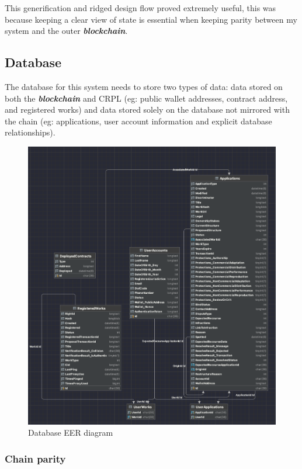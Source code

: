 \documentclass[12pt]{article}
\newcommand{\keyword}[1]{\textbf{\textit{#1}}}
\begin{document}
This generification and ridged design flow proved extremely useful, this was because keeping a clear view of state is essential when keeping parity between my system and the outer \keyword{blockchain}.

\subsection{Database}

The database for this system needs to store two types of data: data stored on both the \keyword{blockchain} and CRPL (eg: public wallet addresses, contract address, and registered works) and data stored solely on the database not mirrored with the chain (eg: applications, user account information and explicit database relationships).

\begin{figure}[H]
\caption{Database EER diagram}
\centering
\includegraphics[width=\textwidth,height=0.5\textheight,keepaspectratio]{images/patterns/database}
\end{figure}

\subsubsection{Chain parity}
\end{document}
